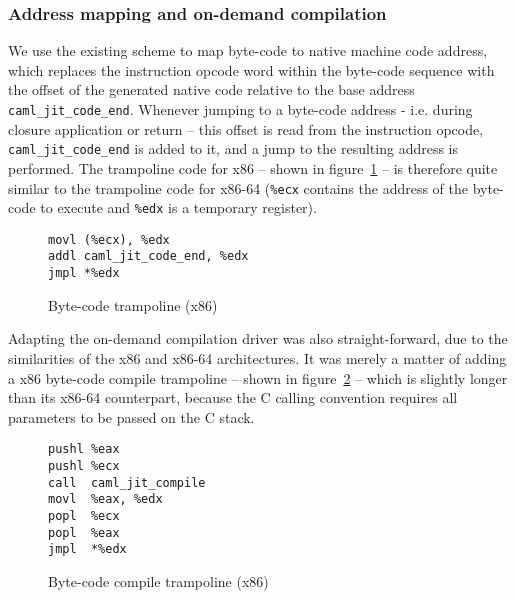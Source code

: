 \documentclass[12pt,a4paper,final]{article}
\begin{document}
\subsubsection{Address mapping and on-demand compilation}

We use the existing scheme \cite{Meurer10:OCamlJit2.0} to map byte-code to native machine code address, which
replaces the instruction opcode word within the byte-code sequence with
the offset of the generated native code relative to the base address
\texttt{caml\_jit\_code\_end}. Whenever jumping to a byte-code address - i.e.
during closure application or return -- this offset is read from the instruction
opcode, \texttt{caml\_jit\_code\_end} is added to it, and a jump to the resulting
address is performed. The trampoline code for x86 -- shown in
figure~\ref{figure:Byte_code_trampoline_x86} -- is therefore quite similar to
the trampoline code for x86-64 (\texttt{\%ecx} contains the address of the
byte-code to execute and \texttt{\%edx} is a temporary register).

\begin{figure}[h]
  \centering
  \begin{varwidth}{\linewidth}
  \begin{verbatim}
movl (%ecx), %edx
addl caml_jit_code_end, %edx
jmpl *%edx
\end{verbatim}
  \end{varwidth}
  \caption{Byte-code trampoline (x86)}
  \label{figure:Byte_code_trampoline_x86}
\end{figure}

Adapting the on-demand compilation driver was also straight-forward, due to
the similarities of the x86 and x86-64 architectures. It was merely a matter
of adding a x86 byte-code compile trampoline -- shown in
figure~\ref{figure:Byte_code_compile_trampoline_x86} -- which is slightly longer
than its x86-64 counterpart, because the C calling convention \cite{SCO97Abi386}
requires all parameters to be passed on the C stack.

\begin{figure}[h]
  \centering
  \begin{varwidth}{\linewidth}
  \begin{verbatim}
pushl %eax
pushl %ecx
call  caml_jit_compile
movl  %eax, %edx
popl  %ecx
popl  %eax
jmpl  *%edx
\end{verbatim}
  \end{varwidth}
  \caption{Byte-code compile trampoline (x86)}
  \label{figure:Byte_code_compile_trampoline_x86}
\end{figure}
\end{document}
